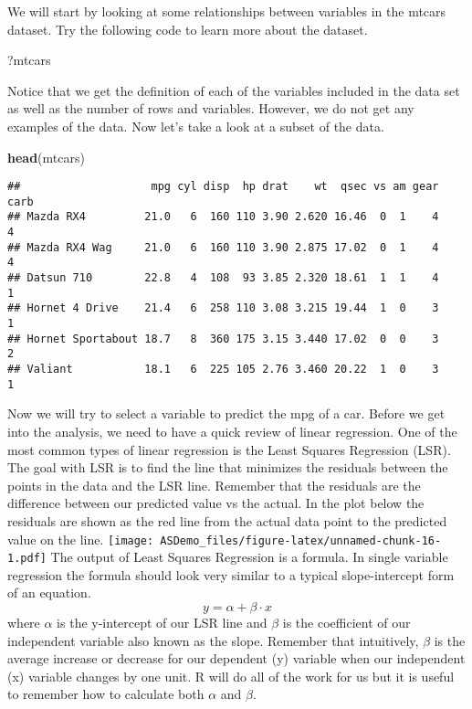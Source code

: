 \documentclass[]{book}
\newenvironment{Shaded}{\begin{snugshade}}{\end{snugshade}}
\newcommand{\KeywordTok}[1]{\textcolor[rgb]{0.13,0.29,0.53}{\textbf{#1}}}
\newcommand{\NormalTok}[1]{#1}
\begin{document}
We will start by looking at some relationships between variables in the
mtcars dataset. Try the following code to learn more about the dataset.

\begin{Shaded}
\begin{Highlighting}[]
\NormalTok{?mtcars}
\end{Highlighting}
\end{Shaded}

Notice that we get the definition of each of the variables included in
the data set as well as the number of rows and variables. However, we do
not get any examples of the data. Now let's take a look at a subset of
the data.

\begin{Shaded}
\begin{Highlighting}[]
\KeywordTok{head}\NormalTok{(mtcars)}
\end{Highlighting}
\end{Shaded}

\begin{verbatim}
##                    mpg cyl disp  hp drat    wt  qsec vs am gear carb
## Mazda RX4         21.0   6  160 110 3.90 2.620 16.46  0  1    4    4
## Mazda RX4 Wag     21.0   6  160 110 3.90 2.875 17.02  0  1    4    4
## Datsun 710        22.8   4  108  93 3.85 2.320 18.61  1  1    4    1
## Hornet 4 Drive    21.4   6  258 110 3.08 3.215 19.44  1  0    3    1
## Hornet Sportabout 18.7   8  360 175 3.15 3.440 17.02  0  0    3    2
## Valiant           18.1   6  225 105 2.76 3.460 20.22  1  0    3    1
\end{verbatim}

Now we will try to select a variable to predict the mpg of a car. Before
we get into the analysis, we need to have a quick review of linear
regression. One of the most common types of linear regression is the
Least Squares Regression (LSR). The goal with LSR is to find the line
that minimizes the residuals between the points in the data and the LSR
line. Remember that the residuals are the difference between our
predicted value vs the actual. In the plot below the residuals are shown
as the red line from the actual data point to the predicted value on the
line. \texttt{[image: ASDemo\_files/figure-latex/unnamed-chunk-16-1.pdf]}
The output of Least Squares Regression is a formula. In single variable
regression the formula should look very similar to a typical
slope-intercept form of an equation. \[y = \alpha + \beta \cdot x\]
where \(\alpha\) is the y-intercept of our LSR line and \(\beta\) is the
coefficient of our independent variable also known as the slope.
Remember that intuitively, \(\beta\) is the average increase or decrease
for our dependent (y) variable when our independent (x) variable changes
by one unit. R will do all of the work for us but it is useful to
remember how to calculate both \(\alpha\) and \(\beta\).
\end{document}
